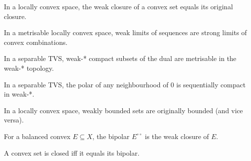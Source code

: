\begin{theorem}
  \label{thm:weak-closure-convex}
  \leanok
  In a locally convex space, the weak closure of a convex set equals
  its original closure.
\end{theorem}

\begin{theorem}
  \label{thm:mazur}
  \leanok
  In a metrisable locally convex space, weak limits of sequences are
  strong limits of convex combinations.
\end{theorem}

\begin{theorem}
  \label{thm:weakStar-metrisable}
  \leanok
  In a separable TVS, weak-* compact subsets of the dual are
  metrisable in the weak-* topology.
\end{theorem}

\begin{theorem}
  \label{thm:banach-alaoglu-sequential}
  \leanok
  In a separable TVS, the polar of any neighbourhood of $0$ is
  sequentially compact in weak-*.
\end{theorem}

\begin{theorem}[Rudin 3.18, weakly bounded $=$ bounded]
  \label{thm:weakly-bounded-iff-bounded}
  \leanok
  In a locally convex space, weakly bounded sets are originally
  bounded (and vice versa).
\end{theorem}

\begin{theorem}
  \label{thm:bipolar}
  \leanok
  For a balanced convex $E \subseteq X$, the bipolar $E^{\circ\circ}$
  is the weak closure of $E$.
\end{theorem}

\begin{theorem}
  \label{thm:convex-closed-iff-bipolar}
  \leanok
  A convex set is closed iff it equals its bipolar.
\end{theorem}

